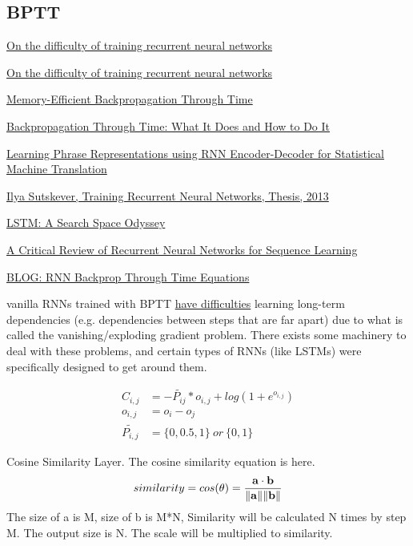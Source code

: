 \documentclass[UTF8,10pt,a4paper]{ctexbook}
\begin{document}
\subsection{BPTT}
\href{http://proceedings.mlr.press/v28/pascanu13.pdf}{On the difficulty of training recurrent neural networks}

\href{https://arxiv.org/abs/1211.5063}{On the difficulty of training recurrent neural networks}

\href{https://arxiv.org/abs/1606.03401}{Memory-Efficient Backpropagation Through Time}

\href{http://axon.cs.byu.edu/~martinez/classes/678/Papers/Werbos_BPTT.pdf}{Backpropagation Through Time: What It Does and How to Do It}

\href{https://arxiv.org/pdf/1406.1078v3.pdf}{Learning Phrase Representations using RNN Encoder-Decoder for Statistical Machine Translation}

\href{http://www.cs.utoronto.ca/~ilya/pubs/ilya_sutskever_phd_thesis.pdf}{Ilya Sutskever, Training Recurrent Neural Networks, Thesis, 2013}

\href{https://arxiv.org/abs/1503.04069}{LSTM: A Search Space Odyssey}

\href{https://arxiv.org/abs/1506.00019}{A Critical Review of Recurrent Neural Networks for Sequence Learning}

\href{https://jramapuram.github.io/ramblings/rnn-backrpop/}{BLOG: RNN Backprop Through Time Equations}

vanilla RNNs trained with BPTT \href{http://www.jmlr.org/proceedings/papers/v28/pascanu13.pdf}{have difficulties} learning long-term dependencies (e.g. dependencies between steps that are far apart) due to what is called the vanishing/exploding gradient problem. There exists some machinery to deal with these problems, and certain types of RNNs (like LSTMs) were specifically designed to get around them.

\[
\begin{aligned}
C_{i,j} & = -\tilde{P_{ij}} * o_{i,j} + log(1 + e^{o_{i,j}})\\o_{i,j} & = o_i - o_j\\\tilde{P_{i,j}} & = \{0, 0.5, 1\} \ or \ \{0, 1\}
\end{aligned}
\]

Cosine Similarity Layer. The cosine similarity equation is here.
\[similarity = cos(\theta) = {\mathbf{a} \cdot \mathbf{b} \over \|\mathbf{a}\| \|\mathbf{b}\|}\]
The size of a is M, size of b is M*N, Similarity will be calculated N times by step M. The output size is N. The scale will be multiplied to similarity.
\end{document}
